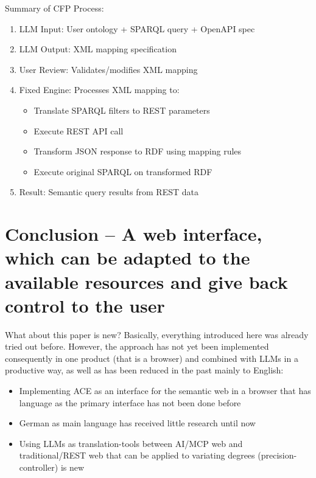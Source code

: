 \documentclass[12pt,a4paper]{article}
\begin{document}
Summary of CFP Process:
\begin{enumerate}
    \item LLM Input: User ontology + SPARQL query + OpenAPI spec
    \item LLM Output: XML mapping specification
    \item User Review: Validates/modifies XML mapping
    \item Fixed Engine: Processes XML mapping to:
    \begin{itemize}
        \item Translate SPARQL filters to REST parameters
        \item Execute REST API call
        \item Transform JSON response to RDF using mapping rules
        \item Execute original SPARQL on transformed RDF
    \end{itemize}
    \item Result: Semantic query results from REST data
\end{enumerate}

\newpage

\section{Conclusion -- A web interface, which can be adapted to the available resources and give back control to the user}

What about this paper is new? Basically, everything introduced here was already tried out before. However, the approach has not yet been implemented consequently in one product (that is a browser) and combined with LLMs in a productive way, as well as has been reduced in the past mainly to English:
\begin{itemize}
    \item Implementing ACE as an interface for the semantic web in a browser that has language as the primary interface has not been done before
    \item German as main language has received little research until now
    \item Using LLMs as translation-tools between AI/MCP web and traditional/REST web that can be applied to variating degrees (precision-controller) is new
\end{itemize}
\end{document}
